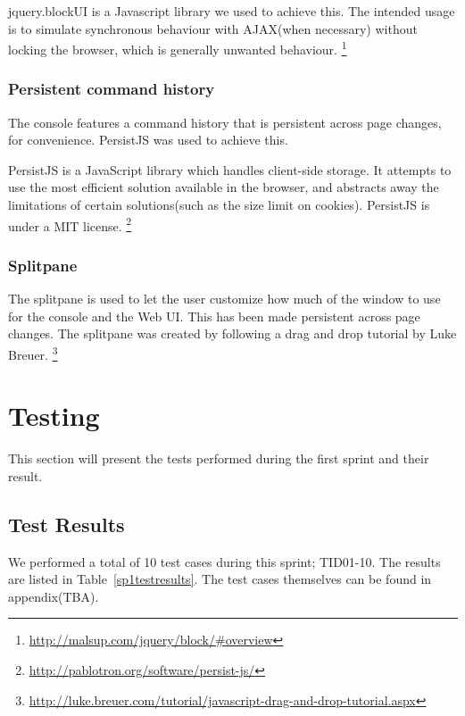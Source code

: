 jquery.blockUI is a Javascript library we used to achieve this. The intended usage is to simulate synchronous behaviour with AJAX(when necessary) without locking the browser, which is generally unwanted behaviour.
\footnote{\url{http://malsup.com/jquery/block/\#overview}}

\subsubsection{Persistent command history}
The console features a command history that is persistent across page changes, for convenience. PersistJS was used to achieve this.

PersistJS is a JavaScript library which handles client-side storage. It attempts to use the most efficient solution available in the browser, and abstracts away the limitations of certain solutions(such as the size limit on cookies).
PersistJS is under a MIT license.
\footnote{\url{http://pablotron.org/software/persist-js/}}

\subsubsection{Splitpane}
The splitpane is used to let the user customize how much of the window to use for the console and the Web UI. This has been made persistent across page changes.
The splitpane was created by following a drag and drop tutorial by Luke Breuer.
\footnote{\url{http://luke.breuer.com/tutorial/javascript-drag-and-drop-tutorial.aspx}}



\section{Testing}
This section will present the tests performed during the first sprint and their result.

\subsection{Test Results}
We performed a total of 10 test cases during this sprint; TID01-10. The results are listed in Table~\ref{sp1testresults}. The test cases themselves can be found in appendix(TBA).

